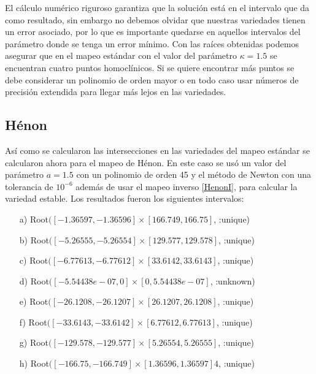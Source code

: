 El cálculo numérico riguroso garantiza que la solución está en el intervalo que da como resultado, sin embargo no debemos olvidar que nuestras variedades tienen un error asociado, por lo que es importante quedarse en aquellos intervalos del parámetro donde se tenga un error mínimo. Con las raíces obtenidas podemos asegurar que en el mapeo estándar con el valor del parámetro $\kappa=1.5$ se encuentran cuatro puntos homoclínicos. Si se quiere encontrar más puntos se debe considerar un polinomio de orden mayor o en todo caso usar números de precisión extendida para llegar más lejos en las variedades. 



\subsection{Hénon}
Así como se calcularon las intersecciones en las variedades del mapeo estándar se calcularon ahora para el mapeo de Hénon. En este caso se usó un valor del parámetro $a=1.5$ con un polinomio de orden 45 y el método de Newton con una tolerancia de $10^{-6}$ además de usar el mapeo inverso \eqref{HenonI}, para calcular la variedad estable. Los resultados fueron los siguientes intervalos:
\begin{itemize}
\item[a)] Root$([-1.36597, -1.36596] \times [166.749, 166.75]$, :unique)
\item[b)] Root$([-5.26555, -5.26554] \times [129.577, 129.578]$, :unique)
\item[c)] Root$([-6.77613, -6.77612] \times [33.6142, 33.6143]$, :unique)
\item[d)] Root$([-5.54438e-07, 0] \times [0, 5.54438e-07]$, :unknown)     
\item[e)] Root$([-26.1208, -26.1207] \times [26.1207, 26.1208]$, :unique)  
\item[f)] Root$([-33.6143, -33.6142] \times [6.77612, 6.77613]$, :unique)  
\item[g)] Root$([-129.578, -129.577] \times [5.26554, 5.26555]$, :unique) 
\item[h)] Root$([-166.75, -166.749] \times [1.36596, 1.36597]4$, :unique)
\end{itemize}

